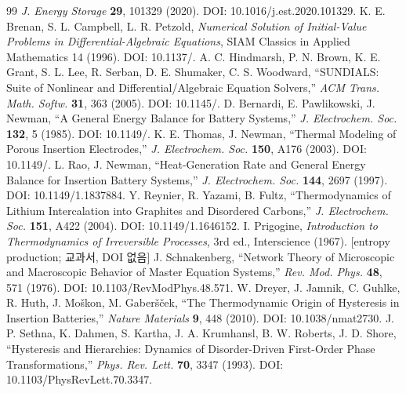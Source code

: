 \begin{thebibliography}{99}
  \emph{J. Energy Storage} \textbf{29}, 101329 (2020). DOI: 10.1016/j.est.2020.101329.
 K. E. Brenan, S. L. Campbell, L. R. Petzold, \emph{Numerical Solution of Initial-Value
  Problems in Differential-Algebraic Equations}, SIAM Classics in Applied Mathematics 14 (1996).
  DOI: 10.1137/.
 A. C. Hindmarsh, P. N. Brown, K. E. Grant, S. L. Lee, R. Serban, D. E. Shumaker,
  C. S. Woodward, ``SUNDIALS: Suite of Nonlinear and Differential/Algebraic Equation Solvers,''
  \emph{ACM Trans. Math. Softw.} \textbf{31}, 363 (2005). DOI: 10.1145/.
 D. Bernardi, E. Pawlikowski, J. Newman, ``A General Energy Balance for Battery
  Systems,'' \emph{J. Electrochem. Soc.} \textbf{132}, 5 (1985). DOI: 10.1149/.
 K. E. Thomas, J. Newman, ``Thermal Modeling of Porous Insertion Electrodes,''
  \emph{J. Electrochem. Soc.} \textbf{150}, A176 (2003). DOI: 10.1149/.
 L. Rao, J. Newman, ``Heat-Generation Rate and General Energy Balance for Insertion
  Battery Systems,'' \emph{J. Electrochem. Soc.} \textbf{144}, 2697 (1997). DOI: 10.1149/1.1837884.
 Y. Reynier, R. Yazami, B. Fultz, ``Thermodynamics of Lithium Intercalation into
  Graphites and Disordered Carbons,'' \emph{J. Electrochem. Soc.} \textbf{151}, A422 (2004).
  DOI: 10.1149/1.1646152.
 I. Prigogine, \emph{Introduction to Thermodynamics of Irreversible Processes},
  3rd ed., Interscience (1967). [entropy production; 교과서, DOI 없음]
 J. Schnakenberg, ``Network Theory of Microscopic and Macroscopic Behavior of
  Master Equation Systems,'' \emph{Rev. Mod. Phys.} \textbf{48}, 571 (1976). DOI: 10.1103/\brk RevModPhys.48.571.
 W. Dreyer, J. Jamnik, C. Guhlke, R. Huth, J. Mo\v{s}kon, M. Gaber\v{s}\v{c}ek,
  ``The Thermodynamic Origin of Hysteresis in Insertion Batteries,'' \emph{Nature Materials} \textbf{9},
  448 (2010). DOI: 10.1038/\brk nmat2730.
 J. P. Sethna, K. Dahmen, S. Kartha, J. A. Krumhansl, B. W. Roberts, J. D. Shore,
  ``Hysteresis and Hierarchies: Dynamics of Disorder-Driven First-Order Phase Transformations,''
  \emph{Phys. Rev. Lett.} \textbf{70}, 3347 (1993). DOI: 10.1103/\brk PhysRevLett.70.3347.
\end{thebibliography}

